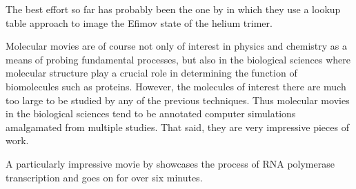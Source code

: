The best effort so far has probably been the one by \citet{Kunitski15} in which they use a lookup table approach to image the Efimov state of the helium trimer.

Molecular movies are of course not only of interest in physics and chemistry as a means of probing fundamental processes, but also in the biological sciences where molecular structure play a crucial role in determining the function of biomolecules such as proteins. However, the molecules of interest there are much too large to be studied by any of the previous techniques. Thus molecular movies in the biological sciences tend to be annotated computer simulations amalgamated from multiple studies. That said, they are very impressive pieces of work.

A particularly impressive movie by \citet{Cheung12} showcases the process of RNA polymerase transcription and goes on for over six minutes.

